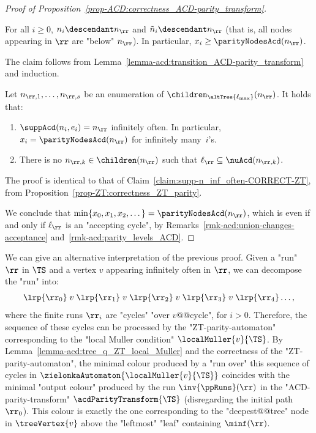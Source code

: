 \documentclass{theoretics}
\begin{document}
\begin{proof}[Proof of Proposition~\ref{prop-ACD:correctness_ACD-parity_transform}]
	\begin{claim}\label{claim-ACD:supp-below-n-CORRECT-ACD}
		For all $i \geq 0$, $n_i \descendant n_\rr$ and $\tilde{n}_i \descendant n_\rr$ (that is, all nodes appearing in $\rr$ are "below" $n_\rr$). In particular, $x_i \geq \parityNodesAcd(n_\rr)$.
	\end{claim}
	\begin{subproof}
		The claim follows from Lemma~\ref{lemma-acd:transition_ACD-parity_transform} and induction.
	\end{subproof}
	\begin{claim}\label{claim-ACD:supp-n_inf_often-CORRECT-ACD}
		Let $n_{\rr,1},\dots, n_{\rr,s}$ be an enumeration of $\children_{\altTree{\ell_{\max}}}(n_\rr)$. It holds that:
		\begin{enumerate}
			\item $\suppAcd(n_i,e_i) = n_\rr$ infinitely often. In particular, $x_i = \parityNodesAcd(n_\rr)$ for infinitely many~$i$'s.
			\item There is no $n_{\rr,k}\in \children(n_\rr)$ such that $\ell_\rr \subseteq \nuAcd(n_{\rr,k})$.
		\end{enumerate}	
	\end{claim}
	\begin{subproof}
		The proof is identical to that of Claim~\ref{claim:supp-n_inf_often-CORRECT-ZT}, from Proposition~\ref{prop-ZT:correctness_ZT_parity}.
	\end{subproof}
	
	 We conclude that $\min\{x_0, x_1, x_2,\dots\} = \parityNodesAcd(n_\rr)$, which is even if and only if $\ell_\rr$ is an "accepting cycle", by Remarks~\ref{rmk-acd:union-changes-acceptance} and~\ref{rmk-acd:parity_levels_ACD}.	 
\end{proof}

\begin{remark}
	We can give an alternative interpretation of the previous proof. Given a "run" $\rr$ in $\TS$ and a vertex $v$ appearing infinitely often in $\rr$, we can decompose the "run" into:
	\[ \lrp{\rr_0} \; v \; \lrp{\rr_1} \; v \;\lrp{\rr_2} \; v \; \lrp{\rr_3} \; v \; \lrp{\rr_4} \dots , \]
	where the finite runs $\rr_i$ are "cycles" "over $v$@@cycle", for $i>0$. Therefore, the sequence of these cycles can be processed by the "ZT-parity-automaton" corresponding to the "local Muller condition" $\localMuller{v}{\TS}$. By Lemma~\ref{lemma-acd:tree_q_ZT_local_Muller} and the correctness of the "ZT-parity-automaton", the minimal colour produced by a "run over" this sequence of cycles in $\zielonkaAutomaton{\localMuller{v}{\TS}}$ coincides with the minimal "output colour" produced by the run $\inv{\ppRuns}(\rr)$ in the "ACD-parity-transform" $\acdParityTransform{\TS}$ (disregarding the initial path $\rr_0$). This colour is exactly the one corresponding to the "deepest@@tree" node in $\treeVertex{v}$ above the "leftmost" "leaf" containing $\minf(\rr)$.
\end{remark}
\end{document}
